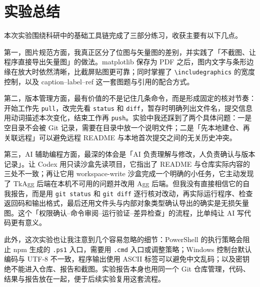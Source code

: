 \documentclass{SYSUReport}
\begin{document}
\section{实验总结}

本次实验围绕科研中的基础工具链完成了三部分练习，收获主要有以下几点。

第一，图片规范方面，我真正区分了位图与矢量图的差别，并实践了「不截图、让程序直接导出矢量图」的做法。matplotlib 保存为 PDF 之后，图内文字与条形边缘在放大时依然清晰，比截屏贴图更可靠；同时掌握了 \texttt{\textbackslash includegraphics} 的宽度控制，以及 caption--label--ref 这一套图题与引用的配合方式。

第二，版本管理方面，最有价值的不是记住几条命令，而是形成固定的核对节奏：开始工作先 \texttt{pull}，改完先看 \texttt{status} 和 \texttt{diff}，暂存时明确列出文件名，提交信息用动词描述本次变化，结束工作再 \texttt{push}。实验中我还踩到了两个具体问题：一是空目录不会被 Git 记录，需要在目录中放一个说明文件；二是「先本地建仓、再关联远程」可以避免远程 README 与本地首次提交之间的无关历史冲突。

第三，AI 辅助编程方面，最深的体会是「AI 负责理解与修改，人负责确认与版本记录」。让 Codex 用只读沙盒先读项目，它指出了 README 与仓库实际内容的三处不一致；再让它用 workspace-write 沙盒完成一个明确的小任务，它主动发现了 TkAgg 后端在本机不可用的问题并改用 Agg 后端。但我没有直接相信它的自我报告，而是用 \texttt{git status} 和 \texttt{git diff} 逐行核对改动，再实际运行程序、检查返回码和输出格式，最后还用文件头与内部对象类型确认导出的确实是无损矢量图。这个「权限确认--命令审阅--运行验证--差异检查」的流程，比单纯让 AI 写代码更有意义。

此外，这次实验也让我注意到几个容易忽略的细节：PowerShell 的执行策略会阻止 npm 生成的 \texttt{.ps1} 入口，需要用 \texttt{.cmd} 入口或调整策略；Windows 控制台默认编码与 UTF-8 不一致，程序输出使用 ASCII 标签可以避免中文乱码；以及密钥绝不能进入仓库、报告和截图。实验报告本身也用同一个 Git 仓库管理，代码、结果与报告放在一起，便于后续实验复用这套流程。
\end{document}
